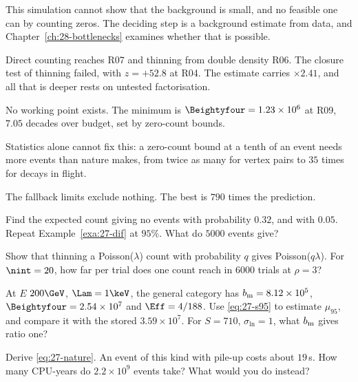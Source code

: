This simulation cannot show that the background is small, and no feasible one can by counting zeros. The deciding step is a background estimate from data, and Chapter~\ref{ch:28-bottlenecks} examines whether that is possible.

\begin{chaptersummary}
  \item Direct counting reaches R07 and thinning from double density R06. The closure test of thinning failed, with $z=+52.8$ at R04. The estimate carries $\times2.41$, and all that is deeper rests on untested factorisation.
  \item No working point exists. The minimum is $\Beightyfour=1.23\times10^6$ at R09, $7.05$ decades over budget, set by zero-count bounds.
  \item Statistics alone cannot fix this: a zero-count bound at a tenth of an event needs more events than nature makes, from twice as many for vertex pairs to $35$ times for decays in flight.
  \item The fallback limits exclude nothing. The best is $790$ times the prediction.
\end{chaptersummary}

\begin{exercises}
  \item\label{ex:27-bound} Find the expected count giving no events with probability $0.32$, and with $0.05$. Repeat Example~\ref{exa:27-dif} at $95\%$. What do $5000$ events give?
  \item\label{ex:27-poisson} Show that thinning a Poisson($\lambda$) count with probability $q$ gives Poisson($q\lambda$). For $\nint=20$, how far per trial does one count reach in $6000$ trials at $\rho=3$?
  \item\label{ex:27-limit} At $E$ $200\GeV$, $\Lam=1\keV$, the general category has $b_{\rm m}=8.12\times10^5$, $\Beightyfour=2.54\times10^7$ and $\Eff=4/188$. Use \eqref{eq:27-s95} to estimate $\mu_{95}$, and compare it with the stored $3.59\times10^7$. For $S=710$, $\sigma_{\ln}=1$, what $b_{\rm m}$ gives ratio one?
  \item\label{ex:27-nature} Derive \eqref{eq:27-nature}. An event of this kind with pile-up costs about $19$\,s. How many CPU-years do $2.2\times10^9$ events take? What would you do instead?
\end{exercises}

